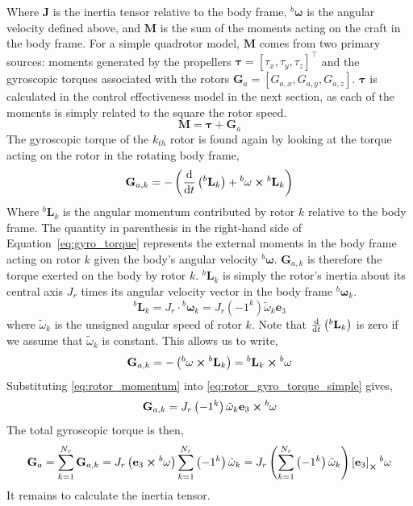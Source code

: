 \documentclass{article}
\begin{document}
	Where $\mathbf{J}$ is the inertia tensor relative to the body frame, ${}^b\mathbf{\omega}$ is the angular velocity defined above, and $\mathbf{M}$ is the sum of the moments acting on the craft in the body frame.  For a simple quadrotor model, $\mathbf{M}$ comes from two primary sources: moments generated by the propellers $\mathbf{\tau} = \left[\tau_x, \tau_y, \tau_z\right]^\top$ and the gyroscopic torques associated with the rotors $\mathbf{G}_a = \left[G_{a,x}, G_{a,y}, G_{a,z}\right]$.  $\mathbf{\tau}$ is calculated in the control effectiveness model in the next section, as each of the moments is simply related to the square the rotor speed.
	\begin{equation}
		\mathbf{M} = \mathbf{\tau} + \mathbf{G}_a
	\end{equation}  
	The gyroscopic torque of the $k_{th}$ rotor is found again by looking at the torque acting on the rotor in the rotating body frame,
	\begin{equation}
		\mathbf{G}_{a,k} = - \left(\dv{}{t}\left({}^b \mathbf{L}_k\right) + {}^b\mathbf{\omega} \cross {}^b \mathbf{L}_k\right)
		\label{eq:gyro_torque}
	\end{equation}
	Where ${}^b \mathbf{L}_k$ is the angular momentum contributed by rotor $k$ relative to the body frame. The quantity in parenthesis in the right-hand side of Equation~\ref{eq:gyro_torque} represents the external moments in the body frame acting on rotor $k$ given the body's angular velocity ${}^b\mathbf{\omega}$.  $\mathbf{G}_{a,k}$ is therefore the torque exerted on the body by rotor $k$. ${}^b \mathbf{L}_k$ is simply the rotor's inertia about its central axis $J_r$ times its angular velocity vector in the body frame ${}^b \mathbf{\omega}_k$.
	\begin{equation}
		{}^b \mathbf{L}_k = J_r \cdot {}^b \mathbf{\omega}_k = J_r\left(-1^k\right) \tilde{\omega}_k \mathbf{e}_3
		\label{eq:rotor_momentum}
	\end{equation}
	where $\tilde{\omega}_k$ is the unsigned angular speed of rotor $k$.  Note that $\dv{}{t}\left({}^b \mathbf{L}_k\right)$ is zero if we assume that $\tilde{\omega}_k$ is constant.  This allows us to write,
	\begin{equation}
		\mathbf{G}_{a,k} = - \left({}^b\mathbf{\omega} \cross {}^b \mathbf{L}_k\right) = {}^b \mathbf{L}_k \cross {}^b\mathbf{\omega}
		\label{eq:rotor_gyro_torque_simple}
	\end{equation}
	Substituting \ref{eq:rotor_momentum} into \ref{eq:rotor_gyro_torque_simple} gives,
	\begin{equation}
		\mathbf{G}_{a,k} = J_r\left(-1^k\right) \tilde{\omega}_k \mathbf{e}_3 \cross {}^b\mathbf{\omega}
	\end{equation}
	The total gyroscopic torque is then,
	\begin{equation}
		\mathbf{G}_a = \sum_{k=1}^{N_r}{\mathbf{G}_{a,k}} = J_r\left(\mathbf{e}_3\cross{}^b\mathbf{\omega}\right)\sum_{k=1}^{N_r}{\left(-1^k\right) \tilde{\omega}_k} = J_r\left(\sum_{k=1}^{N_r}{\left(-1^k\right) \tilde{\omega}_k}\right)  \left[\mathbf{e}_3\right]_{\cross}{}^b\mathbf{\omega}
	\end{equation}
	It remains to calculate the inertia tensor. 
\end{document}
